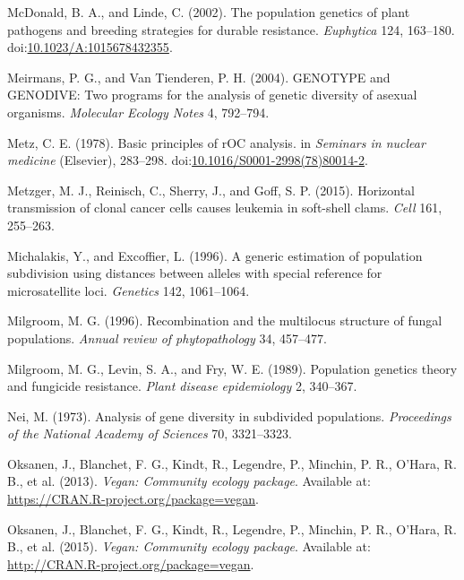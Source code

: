 \documentclass[double,12pt]{beavtex}
\begin{document}
  \hypertarget{ref-Mcdonald2002}{}
  McDonald, B. A., and Linde, C. (2002). The population genetics of plant
  pathogens and breeding strategies for durable resistance.
  \emph{Euphytica} 124, 163--180.
  doi:\href{https://doi.org/10.1023/A:1015678432355}{10.1023/A:1015678432355}.
  
  \hypertarget{ref-meirmans2004genotype}{}
  Meirmans, P. G., and Van Tienderen, P. H. (2004). GENOTYPE and GENODIVE:
  Two programs for the analysis of genetic diversity of asexual organisms.
  \emph{Molecular Ecology Notes} 4, 792--794.
  
  \hypertarget{ref-metz1978basic}{}
  Metz, C. E. (1978). Basic principles of rOC analysis. in \emph{Seminars
  in nuclear medicine} (Elsevier), 283--298.
  doi:\href{https://doi.org/10.1016/S0001-2998(78)80014-2}{10.1016/S0001-2998(78)80014-2}.
  
  \hypertarget{ref-metzger2015horizontal}{}
  Metzger, M. J., Reinisch, C., Sherry, J., and Goff, S. P. (2015).
  Horizontal transmission of clonal cancer cells causes leukemia in
  soft-shell clams. \emph{Cell} 161, 255--263.
  
  \hypertarget{ref-michalakis1996generic}{}
  Michalakis, Y., and Excoffier, L. (1996). A generic estimation of
  population subdivision using distances between alleles with special
  reference for microsatellite loci. \emph{Genetics} 142, 1061--1064.
  
  \hypertarget{ref-milgroom1996recombination}{}
  Milgroom, M. G. (1996). Recombination and the multilocus structure of
  fungal populations. \emph{Annual review of phytopathology} 34, 457--477.
  
  \hypertarget{ref-milgroom1989population}{}
  Milgroom, M. G., Levin, S. A., and Fry, W. E. (1989). Population
  genetics theory and fungicide resistance. \emph{Plant disease
  epidemiology} 2, 340--367.
  
  \hypertarget{ref-nei1973analysis}{}
  Nei, M. (1973). Analysis of gene diversity in subdivided populations.
  \emph{Proceedings of the National Academy of Sciences} 70, 3321--3323.
  
  \hypertarget{ref-oksanen2013vegan}{}
  Oksanen, J., Blanchet, F. G., Kindt, R., Legendre, P., Minchin, P. R.,
  O'Hara, R. B., et al. (2013). \emph{Vegan: Community ecology package}.
  Available at: \url{https://CRAN.R-project.org/package=vegan}.
  
  \hypertarget{ref-oksanen2015vegan}{}
  Oksanen, J., Blanchet, F. G., Kindt, R., Legendre, P., Minchin, P. R.,
  O'Hara, R. B., et al. (2015). \emph{Vegan: Community ecology package}.
  Available at: \url{http://CRAN.R-project.org/package=vegan}.
  
\end{document}
